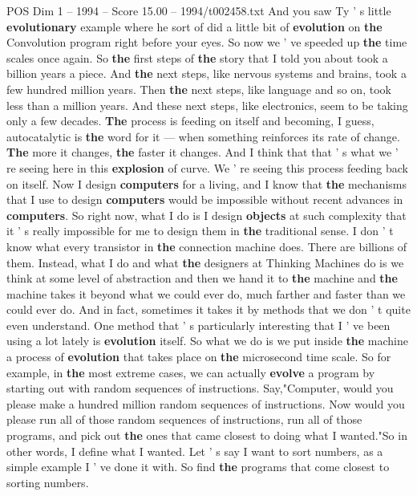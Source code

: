 \begin{textsample}{POS Dim 1 – 1994 – Score 15.00 – 1994/t002458.txt}
And you saw Ty ' s little \textbf{evolutionary} example where he sort of did a little bit of \textbf{evolution} on \textbf{the} Convolution program right before your eyes.
So now we ' ve speeded up \textbf{the} time scales once again.
So \textbf{the} first steps of \textbf{the} story that I told you about took a billion years a piece.
And \textbf{the} next steps, like nervous systems and brains, took a few hundred million years.
Then \textbf{the} next steps, like language and so on, took less than a million years.
And these next steps, like electronics, seem to be taking only a few decades. \textbf{The} process is feeding on itself and becoming, I guess, autocatalytic is \textbf{the} word for it — when something reinforces its rate of change. \textbf{The} more it changes, \textbf{the} faster it changes.
And I think that that ' s what we ' re seeing here in this \textbf{explosion} of curve.
We ' re seeing this process feeding back on itself.
Now I design \textbf{computers} for a living, and I know that \textbf{the} mechanisms that I use to design \textbf{computers} would be impossible without recent advances in \textbf{computers}.
So right now, what I do is I design \textbf{objects} at such complexity that it ' s really impossible for me to design them in \textbf{the} traditional sense.
I don ' t know what every transistor in \textbf{the} connection machine does.
There are billions of them.
Instead, what I do and what \textbf{the} designers at Thinking Machines do is we think at some level of abstraction and then we hand it to \textbf{the} machine and \textbf{the} machine takes it beyond what we could ever do, much farther and faster than we could ever do.
And in fact, sometimes it takes it by methods that we don ' t quite even understand.
One method that ' s particularly interesting that I ' ve been using a lot lately is \textbf{evolution} itself.
So what we do is we put inside \textbf{the} machine a process of \textbf{evolution} that takes place on \textbf{the} microsecond time scale.
So for example, in \textbf{the} most extreme cases, we can actually \textbf{evolve} a program by starting out with random sequences of instructions.
Say,"Computer, would you please make a hundred million random sequences of instructions.
Now would you please run all of those random sequences of instructions, run all of those programs, and pick out \textbf{the} ones that came closest to doing what I wanted."So in other words, I define what I wanted.
Let ' s say I want to sort numbers, as a simple example I ' ve done it with.
So find \textbf{the} programs that come closest to sorting numbers.

\end{textsample}
